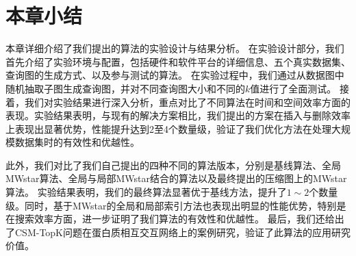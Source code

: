 \section{本章小结}
本章详细介绍了我们提出的算法的实验设计与结果分析。
在实验设计部分，我们首先介绍了实验环境与配置，包括硬件和软件平台的详细信息、五个真实数据集、查询图的生成方式、以及参与测试的算法。
在实验过程中，我们通过从数据图中随机抽取子图生成查询图，并对不同查询图大小和不同的$k$值进行了全面测试。
接着，我们对实验结果进行深入分析，重点对比了不同算法在时间和空间效率方面的表现。实验结果表明，与现有的解决方案相比，我们提出的方案在插入与删除效率上表现出显著优势，性能提升达到2至4个数量级，验证了我们优化方法在处理大规模数据集时的有效性和优越性。

此外，我们对比了我们自己提出的四种不同的算法版本，分别是基线算法、全局MWstar算法、全局与局部MWstar结合的算法以及最终提出的压缩图上的MWstar算法。
实验结果表明，我们的最终算法显著优于基线方法，提升了$1\sim2$个数量级。同时，基于MWstar的全局和局部索引方法也表现出明显的性能优势，特别是在搜索效率方面，进一步证明了我们算法的有效性和优越性。
最后，我们还给出了CSM-TopK问题在蛋白质相互交互网络上的案例研究，验证了此算法的应用研究价值。